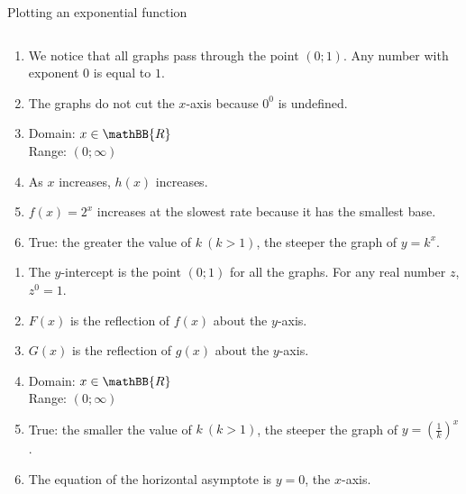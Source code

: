 \begin{wex}{Plotting an exponential function}
{\begin{table}[H]
\begin{center}
\begin{tabular}{|c|c|c|c|c|c|}
\end{tabular}
\end{center}
\end{table}
\begin{enumerate}[noitemsep, label=\textbf{\arabic*}. ] 
\item We notice that all graphs pass through the point $(0;1)$. Any number with exponent $0$ is equal to $1$.
\item The graphs do not cut the $x$-axis because $0^{0}$ is undefined.
\item Domain: $x \in \mathBB{R}$\\
Range: $(0; \infty)$
\item As $x$ increases, $h(x)$ increases.
\item $f(x)=2^{x}$ increases at the slowest rate because it has the smallest base.
\item True: the greater the value of $k ~(k>1)$, the steeper the graph of $y=k^{x}$.
\end{enumerate}
\begin{enumerate}[noitemsep, label=\textbf{\arabic*}. ] 
\item The $y$-intercept is the point $(0; 1)$ for all the graphs. For any real number $z$, $z^{0}=1$.
\item $F(x)$ is the reflection of $f(x)$ about the $y$-axis. 
\item $G(x)$ is the reflection of $g(x)$ about the $y$-axis. 
\item  Domain: $x \in \mathBB{R}$\\
Range: $(0; \infty)$
\item True: the smaller the value of $k ~(k>1)$, the steeper the graph of $y=(\frac{1}{k})^{x}$.
\item The equation of the horizontal asymptote is $y=0$, the $x$-axis.
\end{enumerate}

}
\end{wex}



